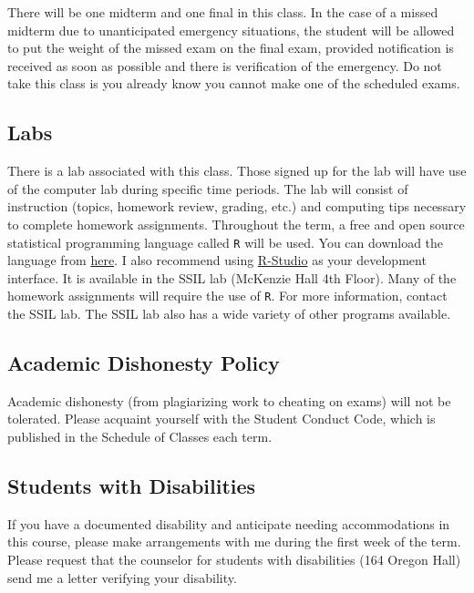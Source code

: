 \documentclass[11pt,]{article}
\begin{document}
There will be one midterm and one final in this class. In the case of a
missed midterm due to unanticipated emergency situations, the student
will be allowed to put the weight of the missed exam on the final exam,
provided notification is received as soon as possible and there is
verification of the emergency. Do not take this class is you already
know you cannot make one of the scheduled exams.

\hypertarget{labs}{%
\subsection{Labs}\label{labs}}

There is a lab associated with this class. Those signed up for the lab
will have use of the computer lab during specific time periods. The lab
will consist of instruction (topics, homework review, grading, etc.) and
computing tips necessary to complete homework assignments. Throughout
the term, a free and open source statistical programming language called
\texttt{R} will be used. You can download the language from
\href{https://cran.r-project.org/}{here}. I also recommend using
\href{https://www.rstudio.com/products/rstudio/download/}{R-Studio} as
your development interface. It is available in the SSIL lab (McKenzie
Hall 4th Floor). Many of the homework assignments will require the use
of \texttt{R}. For more information, contact the SSIL lab. The SSIL lab
also has a wide variety of other programs available.

\hypertarget{academic-dishonesty-policy}{%
\subsection{Academic Dishonesty
Policy}\label{academic-dishonesty-policy}}

Academic dishonesty (from plagiarizing work to cheating on exams) will
not be tolerated. Please acquaint yourself with the Student Conduct
Code, which is published in the Schedule of Classes each term.

\hypertarget{students-with-disabilities}{%
\subsection{Students with
Disabilities}\label{students-with-disabilities}}

If you have a documented disability and anticipate needing
accommodations in this course, please make arrangements with me during
the first week of the term. Please request that the counselor for
students with disabilities (164 Oregon Hall) send me a letter verifying
your disability.
\end{document}
